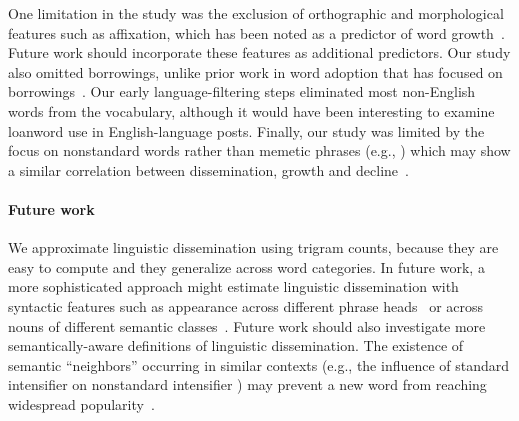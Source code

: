 One limitation in the study was the exclusion of orthographic and morphological features such as affixation, which has been noted as a predictor of word growth~\cite{kershaw2016}.
Future work should incorporate these features as additional predictors.
Our study also omitted borrowings, unlike prior work in word adoption that has focused on borrowings~\cite{chesley2010,garley2012}.
Our early language-filtering steps eliminated most non-English words from the vocabulary, although it would have been interesting to examine loanword use in English-language posts.
Finally, our study was limited by the focus on nonstandard words rather than memetic phrases (e.g., ) which may show a similar correlation between dissemination, growth and decline~\cite{bybee2006}.

\paragraph{Future work} 
We approximate linguistic dissemination using trigram counts, because they are easy to compute and they generalize across word categories. 
In future work, a more sophisticated approach might estimate linguistic dissemination with syntactic features such as appearance across different phrase heads~\cite{kroch1989,ito2003} or across nouns of different semantic classes~\cite{darcy2015}.
Future work should also investigate more semantically-aware definitions of linguistic dissemination.
The existence of semantic ``neighbors'' occurring in similar contexts (e.g., the influence of standard intensifier  on nonstandard intensifier ) may prevent a new word from reaching widespread popularity~\cite{grieve2018}.


